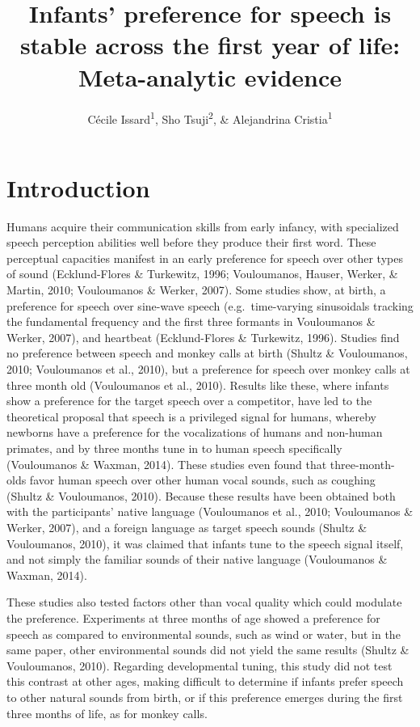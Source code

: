\documentclass[
  man,mask,floatsintext]{apa6}
\title{Infants' preference for speech is stable across the first year of life: Meta-analytic evidence}
\author{Cécile Issard\textsuperscript{1}, Sho Tsuji\textsuperscript{2}, \& Alejandrina Cristia\textsuperscript{1}}
\date{}
\affiliation{\vspace{0.5cm}\textsuperscript{1} Laboratoire de Sciences Cognitives et Psycholinguistique, Ecole Normale Supérieure, Département d'Études Cognitives\\\textsuperscript{2} International Research Center for Neurointelligence, The University of Tokyo}
\begin{document}
\maketitle

\hypertarget{introduction}{%
\section{Introduction}\label{introduction}}

Humans acquire their communication skills from early infancy, with specialized speech perception abilities well before they produce their first word. These perceptual capacities manifest in an early preference for speech over other types of sound (Ecklund-Flores \& Turkewitz, 1996; Vouloumanos, Hauser, Werker, \& Martin, 2010; Vouloumanos \& Werker, 2007). Some studies show, at birth, a preference for speech over sine-wave speech (e.g.~time-varying sinusoidals tracking the fundamental frequency and the first three formants in Vouloumanos \& Werker, 2007), and heartbeat (Ecklund-Flores \& Turkewitz, 1996). Studies find no preference between speech and monkey calls at birth (Shultz \& Vouloumanos, 2010; Vouloumanos et al., 2010), but a preference for speech over monkey calls at three month old (Vouloumanos et al., 2010). Results like these, where infants show a preference for the target speech over a competitor, have led to the theoretical proposal that speech is a privileged signal for humans, whereby newborns have a preference for the vocalizations of humans and non-human primates, and by three months tune in to human speech specifically (Vouloumanos \& Waxman, 2014). These studies even found that three-month-olds favor human speech over other human vocal sounds, such as coughing (Shultz \& Vouloumanos, 2010). Because these results have been obtained both with the participants' native language (Vouloumanos et al., 2010; Vouloumanos \& Werker, 2007), and a foreign language as target speech sounds (Shultz \& Vouloumanos, 2010), it was claimed that infants tune to the speech signal itself, and not simply the familiar sounds of their native language (Vouloumanos \& Waxman, 2014).

These studies also tested factors other than vocal quality which could modulate the preference. Experiments at three months of age showed a preference for speech as compared to environmental sounds, such as wind or water, but in the same paper, other environmental sounds did not yield the same results (Shultz \& Vouloumanos, 2010). Regarding developmental tuning, this study did not test this contrast at other ages, making difficult to determine if infants prefer speech to other natural sounds from birth, or if this preference emerges during the first three months of life, as for monkey calls.
\end{document}
